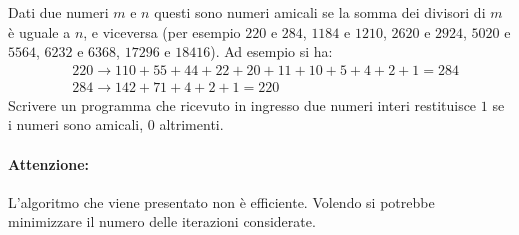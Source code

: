 \begin{Exercise}[label={ex:amicali}]
		Dati due numeri $m$ e $n$ questi sono numeri amicali se la somma dei divisori di $m$ è uguale a $n$, e viceversa (per esempio $220$ e $284$, $1184$ e $1210$, $2620$ e $2924$, $5020$ e $5564$, $6232$ e $6368$, $17296$ e $18416$). Ad esempio si ha:
		\begin{align*}
			& 220 \rightarrow 110 + 55 + 44 + 22 + 20 + 11 + 10 + 5 + 4 + 2 + 1 = 284\\
			& 284 \rightarrow 142 + 71 + 4 + 2 + 1 = 220
		\end{align*}
		Scrivere un programma che ricevuto in ingresso due numeri interi restituisce $1$ se i numeri sono amicali, $0$ altrimenti.
\end{Exercise}

\begin{Answer}[ref={ex:amicali}]
		
		\paragraph{Attenzione: }
			L'algoritmo che viene presentato non \`e efficiente. Volendo si potrebbe minimizzare il numero delle iterazioni considerate.
\end{Answer}